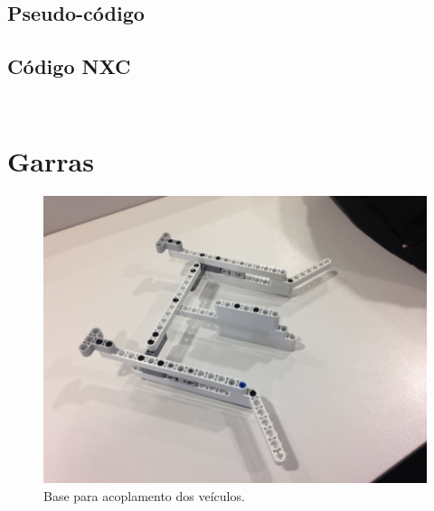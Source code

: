 \documentclass{article}
\begin{document}
	\subsection{Pseudo-código}
	\subsection{Código NXC}
		\inputminted[linenos, frame = single]{c}{../theBugAPI.c}
		
		\inputminted[linenos, frame = single]{c}{../theBugAPI.h}

\newpage
\section{Garras}
	\begin{figure}[h!]
		\includegraphics[width=\linewidth]{../Images/claw_1.JPG}
		\caption{Base para acoplamento dos veículos.}
		\label{fig:claw_1}
	\end{figure}
\end{document}
